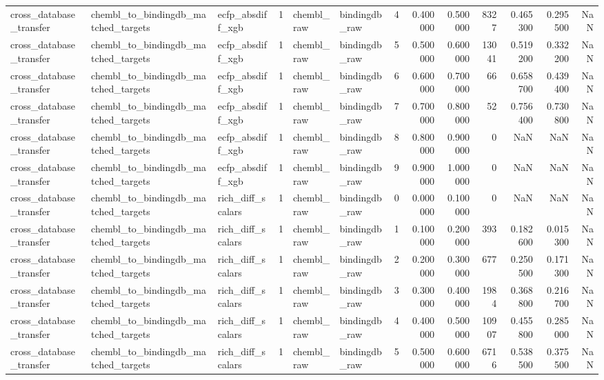 \begin{longtable}{lllrllrrrrrrr}
cross\_database\_transfer & chembl\_to\_bindingdb\_matched\_targets & ecfp\_absdiff\_xgb & 1 & chembl\_raw & bindingdb\_raw & 4 & 0.400000 & 0.500000 & 8327 & 0.465300 & 0.295500 & NaN \\
cross\_database\_transfer & chembl\_to\_bindingdb\_matched\_targets & ecfp\_absdiff\_xgb & 1 & chembl\_raw & bindingdb\_raw & 5 & 0.500000 & 0.600000 & 13041 & 0.519200 & 0.332200 & NaN \\
cross\_database\_transfer & chembl\_to\_bindingdb\_matched\_targets & ecfp\_absdiff\_xgb & 1 & chembl\_raw & bindingdb\_raw & 6 & 0.600000 & 0.700000 & 66 & 0.658700 & 0.439400 & NaN \\
cross\_database\_transfer & chembl\_to\_bindingdb\_matched\_targets & ecfp\_absdiff\_xgb & 1 & chembl\_raw & bindingdb\_raw & 7 & 0.700000 & 0.800000 & 52 & 0.756400 & 0.730800 & NaN \\
cross\_database\_transfer & chembl\_to\_bindingdb\_matched\_targets & ecfp\_absdiff\_xgb & 1 & chembl\_raw & bindingdb\_raw & 8 & 0.800000 & 0.900000 & 0 & NaN & NaN & NaN \\
cross\_database\_transfer & chembl\_to\_bindingdb\_matched\_targets & ecfp\_absdiff\_xgb & 1 & chembl\_raw & bindingdb\_raw & 9 & 0.900000 & 1.000000 & 0 & NaN & NaN & NaN \\
cross\_database\_transfer & chembl\_to\_bindingdb\_matched\_targets & rich\_diff\_scalars & 1 & chembl\_raw & bindingdb\_raw & 0 & 0.000000 & 0.100000 & 0 & NaN & NaN & NaN \\
cross\_database\_transfer & chembl\_to\_bindingdb\_matched\_targets & rich\_diff\_scalars & 1 & chembl\_raw & bindingdb\_raw & 1 & 0.100000 & 0.200000 & 393 & 0.182600 & 0.015300 & NaN \\
cross\_database\_transfer & chembl\_to\_bindingdb\_matched\_targets & rich\_diff\_scalars & 1 & chembl\_raw & bindingdb\_raw & 2 & 0.200000 & 0.300000 & 677 & 0.250500 & 0.171300 & NaN \\
cross\_database\_transfer & chembl\_to\_bindingdb\_matched\_targets & rich\_diff\_scalars & 1 & chembl\_raw & bindingdb\_raw & 3 & 0.300000 & 0.400000 & 1984 & 0.368800 & 0.216700 & NaN \\
cross\_database\_transfer & chembl\_to\_bindingdb\_matched\_targets & rich\_diff\_scalars & 1 & chembl\_raw & bindingdb\_raw & 4 & 0.400000 & 0.500000 & 10907 & 0.455800 & 0.285000 & NaN \\
cross\_database\_transfer & chembl\_to\_bindingdb\_matched\_targets & rich\_diff\_scalars & 1 & chembl\_raw & bindingdb\_raw & 5 & 0.500000 & 0.600000 & 6716 & 0.538500 & 0.375500 & NaN \\

\end{longtable}
